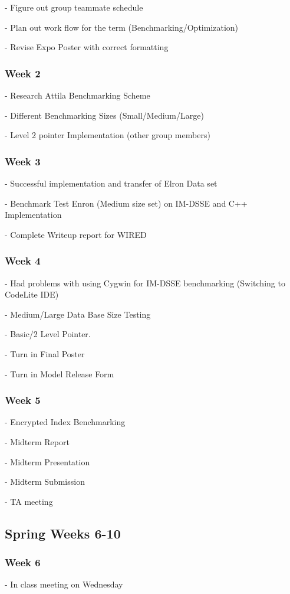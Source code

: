 - Figure out group teammate schedule

- Plan out work flow for the term (Benchmarking/Optimization)

- Revise Expo Poster with correct formatting

\subsubsection{Week 2}
- Research Attila Benchmarking Scheme

- Different Benchmarking Sizes (Small/Medium/Large)

- Level 2 pointer Implementation (other group members)

\subsubsection{Week 3}
- Successful implementation and transfer of Elron Data set

- Benchmark Test Enron (Medium size set) on IM-DSSE and C++ Implementation

- Complete Writeup report for WIRED

\subsubsection{Week 4}
- Had problems with using Cygwin for IM-DSSE benchmarking (Switching to CodeLite IDE)

- Medium/Large Data Base Size Testing

- Basic/2 Level Pointer.

- Turn in Final Poster

- Turn in Model Release Form
\subsubsection{Week 5}
- Encrypted Index Benchmarking

- Midterm Report

- Midterm Presentation

- Midterm Submission

- TA meeting
\subsection {Spring Weeks 6-10}
\subsubsection{Week 6}
- In class meeting on Wednesday

